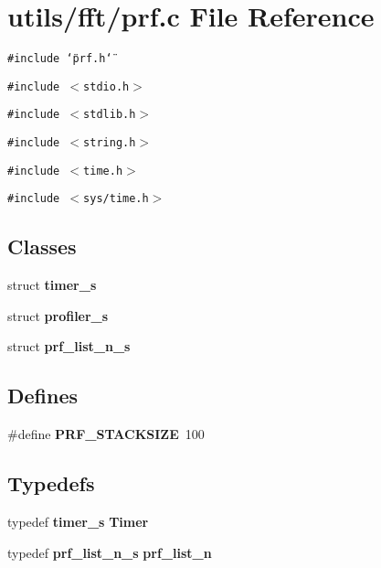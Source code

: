 \section{utils/fft/prf.c File Reference}
\label{prf_8c}
{\tt \#include \char`\"{}prf.h\char`\"{}}\par
{\tt \#include $<$stdio.h$>$}\par
{\tt \#include $<$stdlib.h$>$}\par
{\tt \#include $<$string.h$>$}\par
{\tt \#include $<$time.h$>$}\par
{\tt \#include $<$sys/time.h$>$}\par
\subsection*{Classes}
\begin{CompactItemize}
\item 
struct {\bf timer\_\-s}
\item 
struct {\bf profiler\_\-s}
\item 
struct {\bf prf\_\-list\_\-n\_\-s}
\end{CompactItemize}
\subsection*{Defines}
\begin{CompactItemize}
\item 
\#define {\bf PRF\_\-STACKSIZE}~100
\end{CompactItemize}
\subsection*{Typedefs}
\begin{CompactItemize}
\item 
typedef {\bf timer\_\-s} {\bf Timer}
\item 
typedef {\bf prf\_\-list\_\-n\_\-s} {\bf prf\_\-list\_\-n}
\end{CompactItemize}
